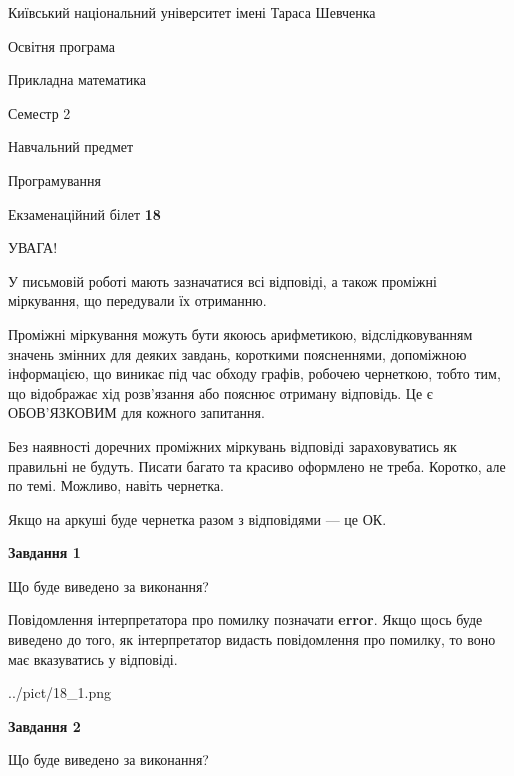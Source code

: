 \documentclass[12pt, ukrainian]{article}
\begin{document}
{{\begin {small}\par
{ \center  Київський національний університет імені Тараса Шевченка \par}
{\parbox {5 cm}{Освітня програма \hfill}{\parbox {7 cm}{Прикладна математика \hfill}}\parbox {6 cm}{\hfill Семестр 2}}\par
{\parbox {5 cm} {Навчальний предмет \hfill}\parbox {7 cm}{Програмування \hfill}\parbox {6cm}{\hfill}\par}\vspace{-7pt} \end{small}}{\center Екзаменаційний білет \No \textbf
{ 18 }\par}}
{
\begin {large}
УВАГА!

У письмовій роботі мають зазначатися всі відповіді, а також проміжні міркування, що передували їх отриманню.

Проміжні міркування можуть бути якоюсь арифметикою, відслідковуванням зна\-чень змінних для деяких завдань,
короткими поясненнями, допоміжною інформацією, що виникає під час обходу графів, робочею чернеткою,
тобто тим, що відображає хід розв’язання або пояснює отриману відповідь.
Це є ОБОВ’ЯЗКОВИМ для кожного запитання.

Без наявності доречних проміжних міркувань відповіді зараховуватись як правиль\-ні не будуть.
Писати багато та красиво оформлено не треба. Коротко, але по темі. Можли\-во, навіть чернетка.

Якщо на аркуші буде чернетка разом з відповідями --- це ОК.

\newpage

{\begin {center}\textbf{Завдання 1}\end {center}}\par
Що буде виведено за виконання?

Повідомлення інтерпретатора про помилку позначати \textbf{error}.
Якщо щось буде виведено до того, як інтерпретатор видасть повідомлення про помилку, 
то воно має вказуватись у відповіді. \par


\begin{center}
	{../pict/18_1.png}
\end{center}
\newpage

{\begin {center}\textbf{Завдання 2}\end {center}}\par
Що буде виведено за виконання?


\end{large}}
\end{document}
